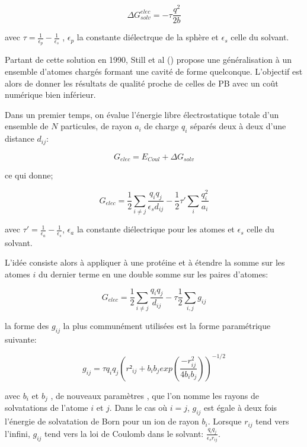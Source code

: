 \begin{equation}
  \label{eq:Born}
  \Delta G_{solv}^{elec} = - \tau \frac{q^2}{2b}
\end{equation}


avec $ \tau = \frac{1}{\epsilon_p} - \frac{1}{\epsilon_s}$ , $\epsilon_p$ la constante diélectrque de la sphère et $\epsilon_s$ celle du solvant.

Partant de cette solution en 1990, Still et al (\cite{Still90}) propose une généralisation à un ensemble d'atomes chargés formant une cavité de forme quelconque. L'objectif est alors de donner les résultats de qualité proche de celles de PB avec un coût numérique bien inférieur.

Dans un premier temps, on évalue l'énergie libre électrostatique totale d'un ensemble de $N$ particules, de rayon $a_i$ de charge $q_i$ séparés deux à deux d'une distance $d_{ij}$:


\begin{equation}
  \label{eq:GB}
  G_{elec} =  E_{Coul} + \Delta G_{solv}
\end{equation}

ce qui donne;

\begin{equation}
  \label{eq:GB}
 G_{elec} =  \frac{1}{2}  \sum_{i \neq j} \frac{q_iq_j}{\epsilon_s d_{ij}}- \frac{1}{2}  \tau' \sum_i\frac{q_i^2}{a_i}
\end{equation}

avec $ \tau' = \frac{1}{\epsilon_a} - \frac{1}{\epsilon_s}$, $\epsilon_a$ la constante diélectrique pour les atomes et $ \epsilon_s$ celle du solvant.


L'idée consiste alors à appliquer   \label{eq:GB} à une protéine et à étendre la somme sur les atomes $i$ du dernier terme en une double somme sur les paires d'atomes:

\begin{equation}
  G_{elec} = \frac{1}{2} \sum_{i \neq j} \frac{q_iq_j}{d_{ij}} - \tau \frac{1}{2} \sum_{i,j} g_{ij}
\end{equation}

la forme des $g_{ij}$ la plus communément utilisées est la forme paramétrique suivante:


\begin{equation}
  \label{eq:GBg}
  g_{ij}= \tau q_iq_j (r²_{ij} + b_ib_j exp(\frac{-r^2_{ij}}{4b_ib_j}))^{-1/2} 
\end{equation}

avec $b_i$ et $b_j$  , de nouveaux paramètres , que l'on nomme les rayons de solvatations de l'atome $i$ et $j$.
Dans le cas où $i=j$, $g_{ij}$ est égale à deux fois l'énergie de solvatation de Born pour un ion de rayon $b_i$.
Lorsque $r_{ij}$ tend vers l'infini, $g_{ij}$ tend vers la loi de Coulomb dans le solvant: $\frac{q_iq_j}{\epsilon_s r_{ij}}$.


